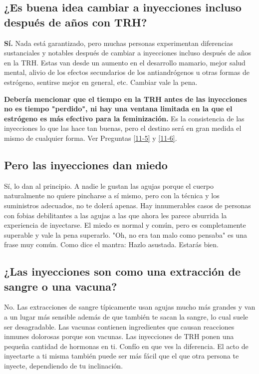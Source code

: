\documentclass{article}
\begin{document}
\subsection{¿Es buena idea cambiar a inyecciones incluso después de años con TRH?}

\textbf{Sí.} Nada está garantizado, pero muchas personas experimentan diferencias sustanciales y notables después de cambiar a inyecciones incluso después de años en la TRH. Estas van desde un aumento en el desarrollo mamario, mejor salud mental, alivio de los efectos secundarios de los antiandrógenos u otras formas de estrógeno, sentirse mejor en general, etc. Cambiar vale la pena.

\textbf{Debería mencionar que el tiempo en la TRH antes de las inyecciones no es tiempo "perdido", ni hay una ventana limitada en la que el estrógeno es más efectivo para la feminización.} Es la consistencia de las inyecciones lo que las hace tan buenas, pero el destino será en gran medida el mismo de cualquier forma. Ver Preguntas \ref{11-5} y \ref{11-6}.

\subsection{Pero las inyecciones dan miedo}

Sí, lo dan al principio. A nadie le gustan las agujas porque el cuerpo naturalmente no quiere pincharse a sí mismo, pero con la técnica y los suministros adecuados, no te dolerá apenas. Hay innumerables casos de personas con fobias debilitantes a las agujas a las que ahora les parece aburrida la experiencia de inyectarse. El miedo es normal y común, pero es completamente superable y vale la pena superarlo. "Oh, no era tan malo como pensaba" es una frase muy común. Como dice el mantra: Hazlo asustada. Estarás bien.

\subsection{¿Las inyecciones son como una extracción de sangre o una vacuna?}

No. Las extracciones de sangre típicamente usan agujas mucho más grandes y van a un lugar más sensible además de que también te sacan la sangre, lo cual suele ser desagradable. Las vacunas contienen ingredientes que causan reacciones inmunes dolorosas porque son vacunas. Las inyecciones de TRH ponen una pequeña cantidad de hormonas en ti. Confío en que ves la diferencia. El acto de inyectarte a ti misma también puede ser más fácil que el que otra persona te inyecte, dependiendo de tu inclinación.
\end{document}
